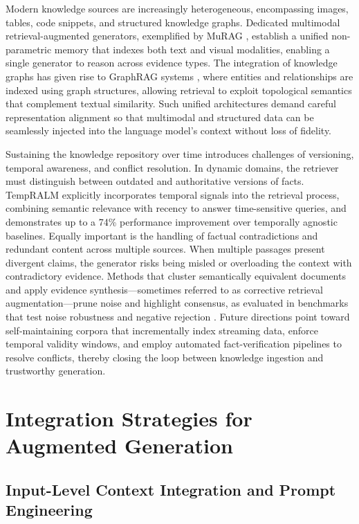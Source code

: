 \documentclass[11pt,a4paper]{article}
\begin{document}
Modern knowledge sources are increasingly heterogeneous, encompassing images, tables, code snippets, and structured knowledge graphs. Dedicated multimodal retrieval-augmented generators, exemplified by MuRAG \cite{arxiv:2210.02928v2}, establish a unified non-parametric memory that indexes both text and visual modalities, enabling a single generator to reason across evidence types. The integration of knowledge graphs has given rise to GraphRAG systems \cite{arxiv:2408.08921v2}, where entities and relationships are indexed using graph structures, allowing retrieval to exploit topological semantics that complement textual similarity. Such unified architectures demand careful representation alignment so that multimodal and structured data can be seamlessly injected into the language model's context without loss of fidelity.

Sustaining the knowledge repository over time introduces challenges of versioning, temporal awareness, and conflict resolution. In dynamic domains, the retriever must distinguish between outdated and authoritative versions of facts. TempRALM \cite{arxiv:2401.13222v2} explicitly incorporates temporal signals into the retrieval process, combining semantic relevance with recency to answer time-sensitive queries, and demonstrates up to a 74\% performance improvement over temporally agnostic baselines. Equally important is the handling of factual contradictions and redundant content across multiple sources. When multiple passages present divergent claims, the generator risks being misled or overloading the context with contradictory evidence. Methods that cluster semantically equivalent documents and apply evidence synthesis---sometimes referred to as corrective retrieval augmentation---prune noise and highlight consensus, as evaluated in benchmarks that test noise robustness and negative rejection \cite{arxiv:2309.01431v2}. Future directions point toward self-maintaining corpora that incrementally index streaming data, enforce temporal validity windows, and employ automated fact-verification pipelines to resolve conflicts, thereby closing the loop between knowledge ingestion and trustworthy generation.


\section{Integration Strategies for Augmented Generation}



\subsection{Input-Level Context Integration and Prompt Engineering}
\end{document}

